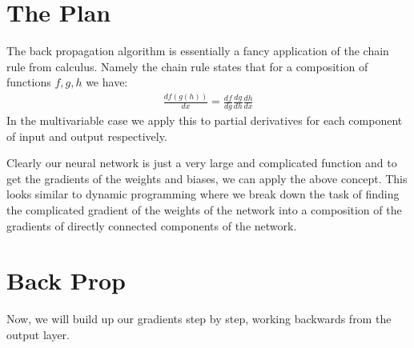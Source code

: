 \documentclass[12pt]{article}
\begin{document}
\section*{The Plan}
The back propagation algorithm is essentially a fancy application of
the chain rule from calculus. Namely the chain rule states that for a composition
of functions $f, g, h$ we have:
\begin{align*}
   \frac{df(g(h))} {dx} = \frac{df}{dg}\frac{dg}{dh}\frac{dh}{dx}
\end{align*}
In the multivariable case we apply this to partial derivatives for each component of input
and output respectively.


Clearly our neural network is just a very large and complicated function and to get the gradients
of the weights and biases, we can apply the above concept. This looks similar to dynamic programming
where we break down the task of finding the complicated gradient of the weights of the network
into a composition of the gradients of directly connected components of the network.

\section*{Back Prop}
Now, we will build up our gradients step by step, working backwards from the output layer.
\end{document}
